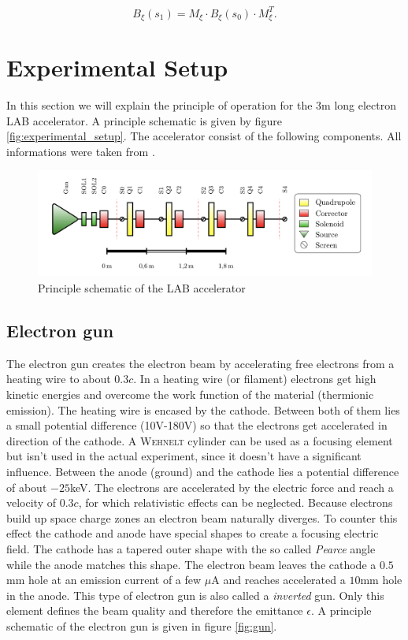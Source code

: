 \documentclass[11pt,a4paper,notitlepage]{scrartcl}
\begin{document}
\begin{equation}
	\label{eq:beta}
	B_\xi(s_1)=M_\xi\cdot B_\xi(s_0)\cdot M_\xi^T.
\end{equation}


\newpage
\section{Experimental Setup}
\label{sec:exp}
In this section we will explain the principle of operation for the 3m long electron LAB accelerator. A principle schematic is given by figure \ref{fig:experimental_setup}. The accelerator consist of the following components. All informations were taken from \cite{script}. 
\begin{figure}[h]
	\includegraphics[width=\linewidth]{./figs/experimental_setup.png}
	\caption{Principle schematic of the LAB accelerator \cite{script}}\label{fig:experimental_setup}
	\label{fig:aufbau}
\end{figure}

\subsection{Electron gun}
The electron gun creates the electron beam by accelerating free electrons from a heating wire to about $0.3c$. In a heating wire (or filament) electrons get high kinetic energies and overcome the work function of the material (thermionic emission). The heating wire is encased by the cathode. Between both of them lies a small potential difference (10V-180V) so that the electrons get accelerated in direction of the cathode. A \textsc{Wehnelt} cylinder can be used as a focusing element but isn't used in the actual experiment, since it doesn't have a significant influence. Between the anode (ground) and the cathode lies a potential difference of about $-25$keV. The electrons are accelerated by the electric force and reach a velocity of $0.3c$, for which relativistic effects can be neglected. Because electrons build up space charge zones an electron beam naturally diverges. To counter this effect the cathode and anode  have special shapes to create a focusing electric field. The cathode has a tapered outer shape with the so called \emph{Pearce} angle while the anode matches this shape. The electron beam leaves the cathode a $0.5$ mm hole at an emission current of a few $\mu$A and reaches accelerated a $10$mm hole in the anode. This type of electron gun is also called a \emph{inverted} gun. Only this element defines the beam quality and therefore the emittance $\epsilon$. A principle schematic of the electron gun is given in figure \ref{fig:gun}.
\end{document}
